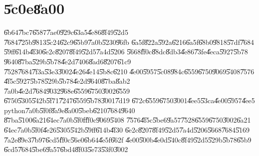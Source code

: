 \documentclass[12pt,a4paper]{article}
\begin{document}
\scalebox{1.1}{}%

\part{\U{5c0e}\U{8a00}}

\bigskip

\U{6b64}\U{7bc7}\U{6587}\U{7ae0}\U{929c}\U{63a5}\U{4e86}\U{8f49}\U{52d5}%
\U{7684}\U{725b}\U{9813}\U{5c24}\U{62c9}\U{65b9}\U{7a0b}\U{5230}\U{96fb}%
\U{6a5f}\U{822a}\U{592a}\U{6216}\U{6a5f}\U{68b0}\U{9818}\U{57df}\U{7684}%
\U{59ff}\U{614b}\U{4f30}\U{6e2c}\U{8207}\U{8f49}\U{52d5}\U{7a4d}\U{5206}%
\U{5668}\U{ff0c}\U{88dc}\U{8db3}\U{4e86}\U{73fe}\U{4eca}\U{5927}\U{5b78}%
\U{9640}\U{87ba}\U{529b}\U{5b78}\U{4e2d}\U{7406}\U{8ad6}\U{8207}\U{61c9}%
\U{7528}\U{7684}\U{7f3a}\U{53e3}\U{3002}\U{4e26}\U{4e14}\U{5b8c}\U{6210}%
\U{4e00}\U{5957}\U{5c08}\U{984c}\U{6559}\U{6750}\U{9069}\U{5408}\U{7576}%
\U{4f5c}\U{5927}\U{5b78}\U{529b}\U{5b78}\U{4e2d}\U{9640}\U{87ba}\U{8ab2}%
\U{7a0b}\U{4e2d}\U{7684}\U{9032}\U{968e}\U{6559}\U{6750}\U{3002}\U{6559}%
\U{6750}\U{5305}\U{542b}\U{5f71}\U{7247}\U{6559}\U{5b78}\U{3001}\U{7d19}%
\U{672c}\U{6559}\U{6750}\U{3001}\U{4ee5}\U{53ca}\U{4e00}\U{5957}\U{4ee5}%
python\U{7a0b}\U{5f0f}\U{8a9e}\U{8a00}\U{5beb}\U{6210}\U{7684}\U{9640}%
\U{87ba}\U{5100}\U{6a21}\U{64ec}\U{7a0b}\U{5f0f}\U{ff0c}\U{9069}\U{5408}%
\U{7576}\U{4f5c}\U{5be6}\U{9a57}\U{7528}\U{6559}\U{6750}\U{3002}\U{6a21}%
\U{64ec}\U{7a0b}\U{5f0f}\U{4e26}\U{5305}\U{542b}\U{59ff}\U{614b}\U{4f30}%
\U{6e2c}\U{8207}\U{8f49}\U{52d5}\U{7a4d}\U{5206}\U{5668}\U{7684}\U{5169}%
\U{7a2e}\U{89e3}\U{7b97}\U{6cd5}\U{ff0c}\U{56e0}\U{6b64}\U{4e5f}\U{662f}%
\U{4e00}\U{500b}\U{4e0d}\U{540c}\U{8f49}\U{52d5}\U{529b}\U{5b78}\U{65b9}%
\U{6cd5}\U{7684}\U{5be6}\U{9a57}\U{6bd4}\U{8f03}\U{5e73}\U{53f0}\U{3002}%
\bigskip
\end{document}
